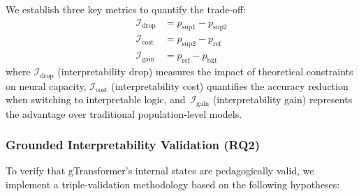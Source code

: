 \documentclass[applsci,article,accept,moreauthors,pdftex]{Definitions/mdpi}
\begin{document}
{We establish three key metrics to quantify the trade-off:}
\begin{align}
\mathcal{I}_{\text{drop}} &= p_{\text{sup}1} - p_{\text{sup}2} \label{eq:int_drop} \\
\mathcal{I}_{\text{cost}} &= p_{\text{sup}2} - p_{\text{ref}}   \label{eq:int_cost} \\
\mathcal{I}_{\text{gain}} &= p_{\text{ref}} - p_{\text{bkt}}   \label{eq:int_gain}
\end{align}
{where $\mathcal{I}_{\text{drop}}$ (interpretability drop) measures the impact of theoretical constraints on neural capacity, $\mathcal{I}_{\text{cost}}$ (interpretability cost) quantifies the accuracy reduction when switching to interpretable logic, and~$\mathcal{I}_{\text{gain}}$ (interpretability gain) represents the advantage over traditional population-level models.}

\subsubsection{{Grounded Interpretability Validation (RQ2)}}

{To verify that gTransformer's internal states are pedagogically valid, we implement a triple-validation methodology based on the following hypotheses:}
\end{document}
